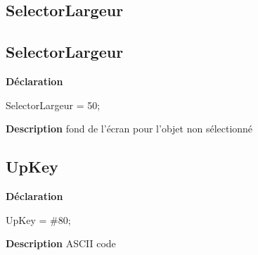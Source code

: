 \documentclass{report}
\newif\ifpdf
\begin{document}
\subsection*{\large{\textbf{SelectorLargeur}}\normalsize\hspace{1ex}\hrulefill}
\else
\subsection*{SelectorLargeur}
\fi
\label{LesMenus-SelectorLargeur}
\begin{list}{}{
\setlength{\itemindent}{0cm}
\setlength{\listparindent}{0cm}
\setlength{\leftmargin}{\evensidemargin}
\addtolength{\leftmargin}{\tmplength}
\settowidth{\labelsep}{X}
\addtolength{\leftmargin}{\labelsep}
\setlength{\labelwidth}{\tmplength}
}
\item[\textbf{Déclaration}\hfill]
\ifpdf
\begin{flushleft}
\fi
\begin{ttfamily}
SelectorLargeur = 50;\end{ttfamily}

\ifpdf
\end{flushleft}
\fi

\par
\item[\textbf{Description}]
fond de l'écran pour l'objet non sélectionné

\end{list}
\ifpdf
\subsection*{\large{\textbf{UpKey}}\normalsize\hspace{1ex}\hrulefill}
\else
\subsection*{UpKey}
\fi
\label{LesMenus-UpKey}
\begin{list}{}{
\setlength{\itemindent}{0cm}
\setlength{\listparindent}{0cm}
\setlength{\leftmargin}{\evensidemargin}
\addtolength{\leftmargin}{\tmplength}
\settowidth{\labelsep}{X}
\addtolength{\leftmargin}{\labelsep}
\setlength{\labelwidth}{\tmplength}
}
\item[\textbf{Déclaration}\hfill]
\ifpdf
\begin{flushleft}
\fi
\begin{ttfamily}
UpKey = {\#}80;\end{ttfamily}

\ifpdf
\end{flushleft}
\fi

\par
\item[\textbf{Description}]
ASCII code

\end{list}
\ifpdf
\end{document}

